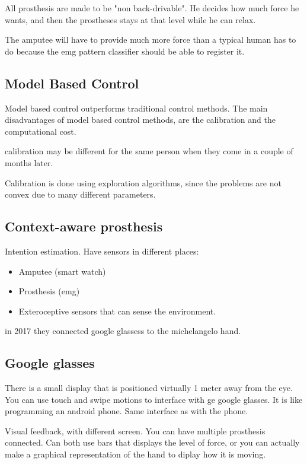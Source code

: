 \documentclass[a4paper]{article}
\begin{document}
All prosthesis are made to be "non back-drivable". He decides how much force he wants, and then the prostheses stays at that level while he can relax. 

The amputee will have to provide much more force than a typical human has to do because the emg pattern classifier should be able to register it. 


\subsection{Model Based Control}
Model based control outperforms traditional control methods. 
The main disadvantages of model based control methods, are the calibration and the computational cost. 

calibration may be different for the same person when they come in a couple of months later. 

Calibration is done using exploration algorithms, since the problems are not convex due to many different parameters. 

\subsection{Context-aware prosthesis}
Intention estimation. 
Have sensors in different places:
\begin{itemize}
	\item Amputee (smart watch)
	\item Prosthesis (emg)
	\item Exteroceptive sensors that can sense the environment. 
\end{itemize}

in 2017 they connected google glassess to the michelangelo hand.

\vspace{5pt}

\subsection{Google glasses}
There is a small display that is positioned virtually 1 meter away from the eye. You can use touch and swipe motions to interface with ge google glasses. It is like programming an android phone. Same interface as with the phone. 

Visual feedback, with different screen. You can have multiple prosthesis connected. 
Can both use bars that displays the level of force, or you can actually make a graphical representation of the hand to diplay how it is moving. 
\end{document}
